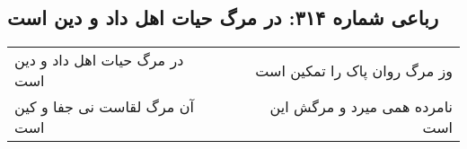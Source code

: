 \begin{center}
\section*{رباعی شماره ۳۱۴: در مرگ حیات اهل داد و دین است}
\label{sec:0314}
\begin{longtable}{l p{0.5cm} r}
در مرگ حیات اهل داد و دین است
&&
وز مرگ روان پاک را تمکین است
\\
آن مرگ لقاست نی جفا و کین است
&&
نامرده همی میرد و مرگش این است
\\
\end{longtable}
\end{center}

